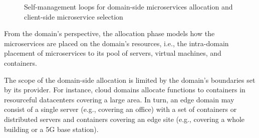 \begin{figure}[thbp]
	\centering
	\captionsetup[subfigure]{width=0.4\textwidth}	
	\null\hfill
	\captionsetup[subfigure]{width=0.4\textwidth}	
	\hfill
	\hfill\null
	\caption{Self-management loops for domain-side microservices allocation and client-side microservice selection}\label{fig:allocation-loops}
\end{figure}

From the domain's perspective, the allocation phase models how the microservices are placed on the domain's resources, i.e., the intra-domain placement of microservices to its pool of servers, virtual machines, and containers. 

The scope of the domain-side allocation is limited by the domain's boundaries set by its provider. For instance, cloud domains allocate functions to containers in resourceful datacenters covering a large area. In turn, an edge domain may consist of a single server (e.g., covering an office) with a set of containers or distributed servers and containers covering an edge site (e.g., covering a whole building or a 5G base station).



